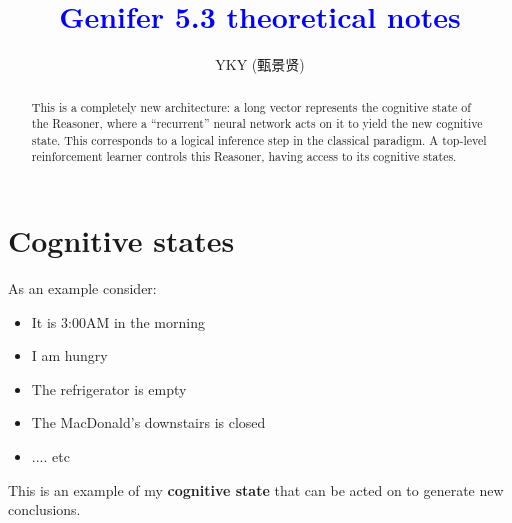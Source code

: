 \documentclass[12pt]{article}
\title{\textcolor{blue}{Genifer 5.3 theoretical notes}}
\author{YKY (甄景贤)}
\newcommand{\tab}{\hspace*{1cm}}
\begin{document}



\maketitle
\setlength{\parindent}{0em}
\setlength{\parskip}{2.5ex plus0.5ex minus1.2ex}

\begin{abstract}
This is a completely new architecture: a long vector represents the cognitive state of the Reasoner, where a ``recurrent'' neural network acts on it to yield the new cognitive state.  This corresponds to a logical inference step in the classical paradigm.  A top-level reinforcement learner controls this Reasoner, having access to its cognitive states.
\end{abstract}

\setlength{\abovecaptionskip}{-10ex}
\setlength{\belowcaptionskip}{-18ex}

\setlength{\oddsidemargin}{1cm}
\setlength{\evensidemargin}{1cm}
\setlength{\textwidth}{14cm}

\linespread{1.2}

\section{Cognitive states}

As an example consider:
\begin{itemize}
\item It is 3:00AM in the morning
\item I am hungry
\item The refrigerator is empty
\item The MacDonald's downstairs is closed
\item .... etc
\end{itemize}
This is an example of my \textbf{cognitive state} that can be acted on to generate new conclusions.
\end{document}

